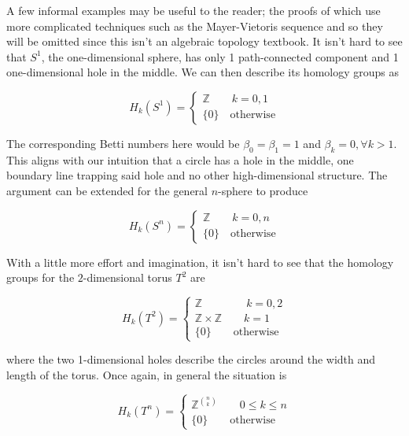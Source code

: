 A few informal examples may be useful to the reader; the proofs of which use more complicated techniques such as the Mayer-Vietoris sequence and so they will be omitted since this isn't an algebraic topology textbook. It isn't hard to see that $S^{1}$, the one-dimensional sphere, has only 1 path-connected component and 1 one-dimensional hole in the middle. We can then describe its homology groups as

\begin{equation*}
  H_{k}(S^{1}) = \begin{cases}
    \mathbb{Z} \qquad k = 0,1 \\
    \{0\} \quad \text{otherwise}
  \end{cases}
\end{equation*}

The corresponding Betti numbers here would be $\beta_{0} = \beta_{1} = 1$ and $\beta_{k} = 0, \forall k > 1$. This aligns with our intuition that a circle has a hole in the middle, one boundary line trapping said hole and no other high-dimensional structure. The argument can be extended for the general $n$-sphere to produce

\begin{equation*}
  H_{k}(S^{n}) = \begin{cases}
    \mathbb{Z} \qquad k = 0,n \\
    \{0\} \quad \text{otherwise}
  \end{cases}
\end{equation*}

With a little more effort and imagination, it isn't hard to see that the homology groups for the $2$-dimensional torus $T^{2}$ are

\begin{equation*}
  H_{k}(T^{2}) = \begin{cases}
    \mathbb{Z} \qquad \qquad k = 0,2 \\
    \mathbb{Z} \times \mathbb{Z} \qquad k = 1 \\
    \{0\} \qquad \text{otherwise}
  \end{cases}
\end{equation*}

where the two 1-dimensional holes describe the circles around the width and length of the torus. Once again, in general the situation is

\begin{equation*}
  H_{k}(T^{n}) = \begin{cases}
    \mathbb{Z}^{\binom{n}{k}} \qquad 0 \leq k \leq n  \\
    \{0\} \qquad \text{otherwise}
  \end{cases}
\end{equation*}

